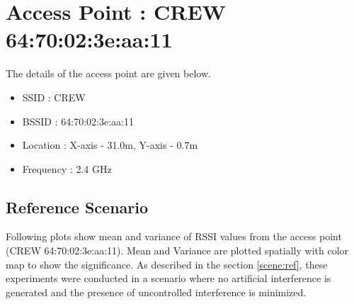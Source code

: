 \documentclass[11pt,a4paper,headinclude,footinclude,chapterprefix=on]{scrreprt}
\begin{document}
\begin{longtable}
\end{longtable}

\section{Access Point : CREW 64:70:02:3e:aa:11} 
The details of the access point are given below.
\begin{itemize}
	\item SSID : CREW 
	\item BSSID : 64:70:02:3e:aa:11 
	\item Location : X-axis - 31.0m, Y-axis - 0.7m 
	\item Frequency : 2.4 GHz 
\end{itemize}
\subsection{Reference Scenario} 
Following plots show mean and variance of RSSI values from the access point (CREW 64:70:02:3e:aa:11). Mean and Variance are plotted spatially with color map to show the significance. As described in the section \ref{scene:ref}, these experiments were conducted in a scenario where no artificial interference is generated and the presence of uncontrolled interference is minimized.
\end{document}
